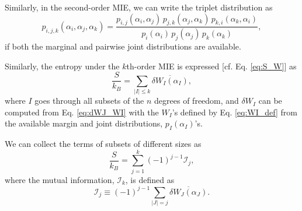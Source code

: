 \documentclass[preprint, superscriptaddress]{revtex4-1}
\newcommand{\MI}{\mathcal I} %
\begin{document}
Similarly, in the second-order MIE, we can write
the triplet distribution as
$$
p_{i,j,k}(\alpha_i, \alpha_j, \alpha_k)
=
\frac{ p_{i,j}(\alpha_i, \alpha_j) \, p_{j,k}(\alpha_j, \alpha_k) \, p_{k,i}(\alpha_k, \alpha_i) }{ p_i(\alpha_i) \, p_j(\alpha_j) \, p_k(\alpha_k) }
,
$$
if both the marginal and pairwise joint distributions are available.

Similarly, the entropy under the $k$th-order MIE is expressed
[cf. Eq. \eqref{eq:S_W}] as
$$
\frac{S}{k_B}
=
\sum_{|I| \le k} \overline{ \delta W_I(\alpha_I) },
$$
where $I$ goes through all subsets of the $n$ degrees of freedom,
and $\delta W_I$ can be computed from Eq. \eqref{eq:dWJ_WI}
with the $W_I$'s defined by Eq. \eqref{eq:WI_def}
from the available margin and joint distributions, $p_I(\alpha_I)$'s.

We can collect the terms of subsets of different sizes as
$$
\frac{S}{k_B}
=
\sum_{j = 1}^k (-1)^{j-1} \MI_j,
$$
%
where the mutual information, $\MI_k$, is defined as
$$
\MI_j \equiv (-1)^{j-1} \sum_{|J| = j} \overline{ \delta W_J(\alpha_J) }.
$$


\end{document}
